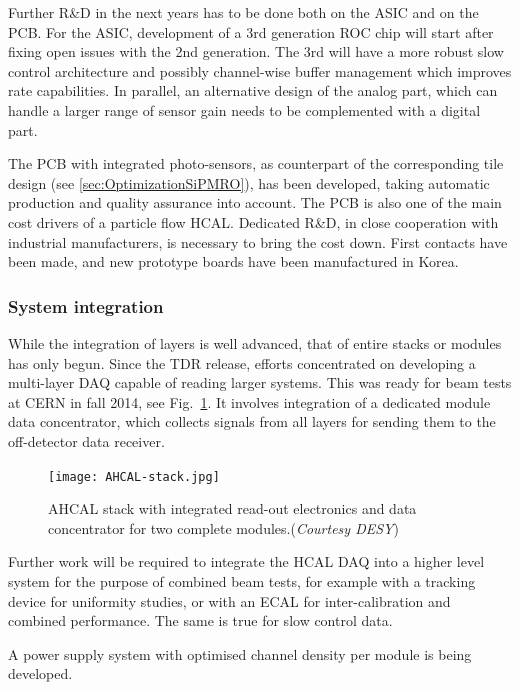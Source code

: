 Further R\&D in the next years has to be done both on the ASIC and on the PCB. For the ASIC, development of a 3rd generation ROC chip will start after fixing open issues with the 2nd generation. The 3rd will have a more robust slow control architecture and possibly channel-wise buffer management which improves rate capabilities. In parallel, an alternative design of the analog part, which can handle a larger range of sensor gain needs to be complemented with a digital part.

The PCB with integrated photo-sensors, as counterpart of the corresponding tile design (see \ref{sec:OptimizationSiPMRO}), has been developed, taking automatic production and quality assurance into account. The PCB is also one of the main cost drivers of a particle flow HCAL. Dedicated R\&D, in close cooperation with industrial manufacturers, is necessary to bring the cost down. First contacts have been made, and new prototype boards have been manufactured in Korea.

\subsubsection{System integration}

While the integration of layers is well advanced, that of entire stacks or modules has only begun. Since the TDR release, efforts concentrated on developing a multi-layer DAQ capable of reading larger systems. This was ready for beam tests at CERN  in fall 2014,
see Fig.~\ref{fig:stack}. It involves integration of a dedicated module data concentrator, which collects signals from all layers for sending them to the off-detector data receiver.
%
\begin{figure}[htb]
\begin{center}
\texttt{[image: AHCAL-stack.jpg]}
\end{center}
\caption{\label{fig:stack} AHCAL stack with integrated read-out electronics and data concentrator for two complete modules.({\it Courtesy DESY})}
\end{figure}



Further work will be required to integrate the HCAL DAQ into a higher level system for the purpose of combined beam tests, for example with a tracking device for uniformity studies, or with an ECAL for inter-calibration and combined performance. The same is true for slow control data.

A power supply system with optimised channel density per module is being developed.

